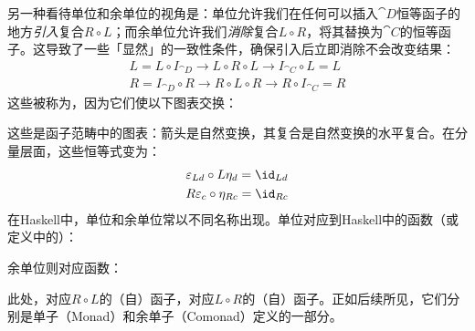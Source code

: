 另一种看待单位和余单位的视角是：单位允许我们在任何可以插入$\cat{D}$恒等函子的地方\emph{引入}复合$R \circ L$；而余单位允许我们\emph{消除}复合$L \circ R$，将其替换为$\cat{C}$的恒等函子。这导致了一些「显然」的一致性条件，确保引入后立即消除不会改变结果：
\begin{gather*}
  L = L \circ I_{\cat{D}} \to L \circ R \circ L \to I_{\cat{C}} \circ L = L \\
  R = I_{\cat{D}} \circ R \to R \circ L \circ R \to R \circ I_{\cat{C}} = R
\end{gather*}
这些被称为，因为它们使以下图表交换：

\begin{figure}[H]
  \centering

  \begin{subfigure}
    \centering
  \end{subfigure}%
  \hspace{1cm}
  \begin{subfigure}
    \centering
  \end{subfigure}
\end{figure}

\noindent
这些是函子范畴中的图表：箭头是自然变换，其复合是自然变换的水平复合。在分量层面，这些恒等式变为：
\begin{gather*}
  \varepsilon_{L d} \circ L \eta_d = \id_{L d} \\
  R \varepsilon_{c} \circ \eta_{R c} = \id_{R c}
\end{gather*}
在Haskell中，单位和余单位常以不同名称出现。单位对应到Haskell中的函数（或定义中的）：

余单位则对应函数：

此处，对应$R \circ L$的（自）函子，对应$L \circ R$的（自）函子。正如后续所见，它们分别是单子（Monad）和余单子（Comonad）定义的一部分。

